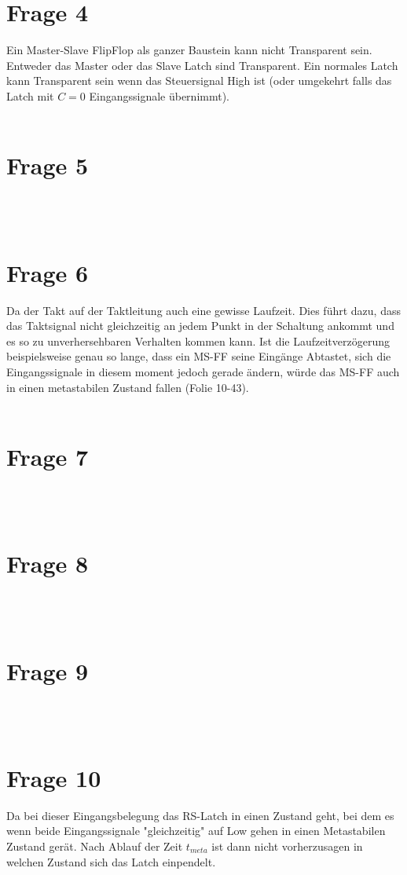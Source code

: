 \documentclass[a4paper]{scrartcl}
\begin{document}
\section*{Frage 4}
Ein Master-Slave FlipFlop als ganzer Baustein kann nicht Transparent sein. Entweder das Master oder das Slave Latch sind Transparent. Ein normales Latch kann Transparent sein wenn das Steuersignal High ist (oder umgekehrt falls das Latch mit $C=0$ Eingangssignale übernimmt).
~\\
~\\
\section*{Frage 5}

~\\
~\\
\section*{Frage 6}
Da der Takt auf der Taktleitung auch eine gewisse Laufzeit. Dies führt dazu, dass das Taktsignal nicht gleichzeitig an jedem Punkt in der Schaltung ankommt und es so zu unverhersehbaren Verhalten kommen kann. Ist die Laufzeitverzögerung beispielsweise genau so lange, dass ein MS-FF seine Eingänge Abtastet, sich die Eingangssignale in diesem moment jedoch gerade ändern, würde das MS-FF auch in einen metastabilen Zustand fallen (Folie 10-43).
~\\
~\\
\section*{Frage 7}

~\\
~\\
\section*{Frage 8}

~\\
~\\
\section*{Frage 9}

~\\
~\\
\section*{Frage 10}
Da bei dieser Eingangsbelegung das RS-Latch in einen Zustand geht, bei dem es wenn beide Eingangssignale "gleichzeitig" auf Low gehen in einen Metastabilen Zustand gerät. Nach Ablauf der Zeit $t_{meta}$ ist dann nicht vorherzusagen in welchen Zustand sich das Latch einpendelt.
~\\
~\\
\end{document}
